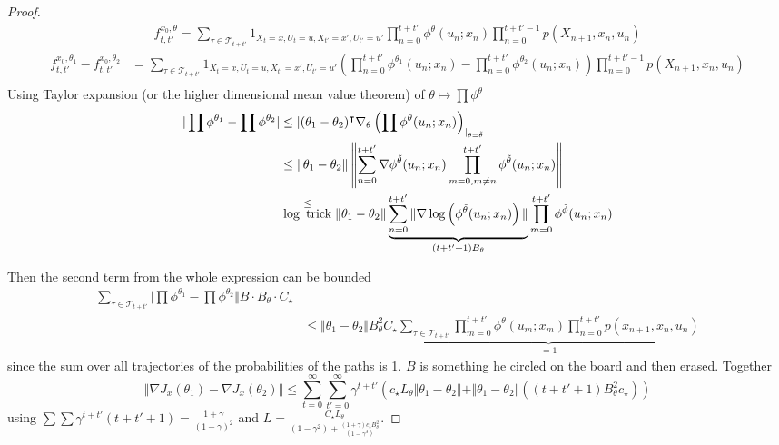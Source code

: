 \begin{proof}
    \begin{align*}
        f_{t,t'}^{x_0,\theta}=\sum_{\tau\in \mathcal{T}_{t+t'}} 1_{X_t=x,U_t=u,X_{t'}=x',U_{t'}=u'}\prod_{n=0}^{t+t'}\phi^\theta(u_n;x_n)\prod_{n=0}^{t+t'-1}p(X_{n+1},x_n,u_n)
    \end{align*}
    \begin{align*}
        f_{t,t'}^{x_0,\theta_1}-f_{t,t'}^{x_0,\theta_2}&=\sum_{\tau\in \mathcal{T}_{t+t'}} 1_{X_t=x,U_t=u,X_{t'}=x',U_{t'}=u'}\left(\prod_{n=0}^{t+t'}\phi^{\theta_1}(u_n;x_n)-\prod_{n=0}^{t+t'}\phi^{\theta_2}(u_n;x_n)\right)\prod_{n=0}^{t+t'-1}p(X_{n+1},x_n,u_n)\\
    \end{align*}
    Using Taylor expansion (or the higher dimensional mean value theorem) of \(\theta\mapsto \prod \phi^\theta\)
    \begin{align*}
        \vert \prod \phi^{\theta_1}-\prod \phi^{\theta_2}\vert&\leq \vert (\theta_1-\theta_2)^\intercal \nabla_\theta\left(\prod \phi^\theta(u_n;x_n)\right)_{|_{\theta=\tilde{\theta}}} \vert \\
        &\leq \Vert \theta_1-\theta_2\Vert \left\Vert \sum_{n=0}^{t+t'}\nabla\phi^{\tilde{\theta}}(u_n;x_n) \prod_{m=0,m\neq n}^{t+t'}\phi^{\tilde{\theta}}(u_n;x_n) \right\Vert\\
        &\stackrel{\leq }{\log \text{ trick}} \Vert \theta_1-\theta_2\Vert \underbrace{\sum_{n=0}^{t+t'}\Vert \nabla\log \left(\phi^{\tilde{\theta}}(u_n;x_n)\right)\Vert}_{(t+t'+1)B_{\theta}} \prod_{m=0}^{t+t'}\phi^{\tilde{\phi}}(u_n;x_n)
    \end{align*}

    Then the second term from the whole expression  can be bounded 
    \begin{align*}
        \sum_{\tau\in \mathcal{T}_{t+t'}}\vert \prod \phi^{\theta_1}-\prod \phi^{\theta_2}\Vert B \cdot B_\theta \cdot C_\star\\
        &\leq \Vert \theta_1-\theta_2\Vert B_\theta^2 C_\star \underbrace{\sum_{\tau\in \mathcal{T}_{t+t'}}\prod_{m=0}^{t+t'}\phi^\theta(u_m;x_m)\prod_{n=0}^{t+t'}p(x_{n+1},x_n,u_n)}_{=1}
    \end{align*}
    since the sum over all trajectories of the probabilities of the paths is 1. \(B\) is something he circled on the board and then erased.
    Together \[\Vert \nabla J_x(\theta_1)-\nabla J_x(\theta_2)\Vert\leq \sum_{t=0}^{\infty}\sum_{t'=0}^{\infty}\gamma^{t+t'}\left(c_\star L_\theta\Vert \theta_1-\theta_2\Vert + \Vert \theta_1-\theta_2\Vert\left((t+t'+1)B_\theta^2 c_\star\right)\right)\]
    using \(\sum\sum\gamma^{t+t'}(t+t'+1)=\frac{1+\gamma}{(1-\gamma)^2}\)
    and \(L=\frac{C_\star L_\theta}{(1-\gamma^2)+\frac{(1+\gamma)c_\star B_\theta^2}{(1-\gamma^3)}}\).
\end{proof}




















